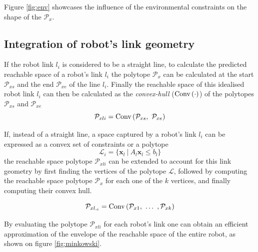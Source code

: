 Figure \ref{fig:env} showcases the influence of the environmental constraints on the shape of the $\mathcal{P}_x$.



\subsection{Integration of robot's link geometry}

If the robot link $l_i$ is considered to be a straight line, to calculate the predicted reachable space of a robot's link $l_i$ the polytope $\mathcal{P}_x$ can be calculated at the start $\mathcal{P}_{xs}$ and the end $\mathcal{P}_{xe}$ of the line $l_i$.  Finally the reachable space of this idealised robot link $l_i$ can then be calculated as the \textit{convex-hull} ($\text{Conv}\left(\cdot\right)$) of the polytopes $\mathcal{P}_{xs}$ and $\mathcal{P}_{xe}$
\begin{equation}
    \mathcal{P}_{xli} = \text{Conv}\left(  \mathcal{P}_{xs}, ~ \mathcal{P}_{xe}\right)
\end{equation}

If, instead of a straight line, a space captured by a robot's link $l_i$ can be expressed as a convex set of constraints or a polytope
\begin{equation}
    \mathcal{L}_i = \Big \{ \bm{x}_l ~ |~ A_l \bm{x}_l \leq b_l \Big\}
\end{equation}
the reachable space polytope $\mathcal{P}_{xli}$ can be extended to account for this link geometry by first finding the vertices of the polytope $\mathcal{L}$, followed by computing the reachable space polytope $\mathcal{P}_{x}$ for each one of the $k$ vertices, and finally computing their convex hull. 

\begin{equation}
    \mathcal{P}_{xl,_i} = \text{Conv}\left(  \mathcal{P}_{x1}, ~ \dots ~, \mathcal{P}_{xk} \right)
\end{equation}

By evaluating the polytope $\mathcal{P}_{xli}$ for each robot's link one can obtain an efficient approximation of the envelope of the reachable space of the entire robot, as shown on figure \ref{fig:minkowski}.



